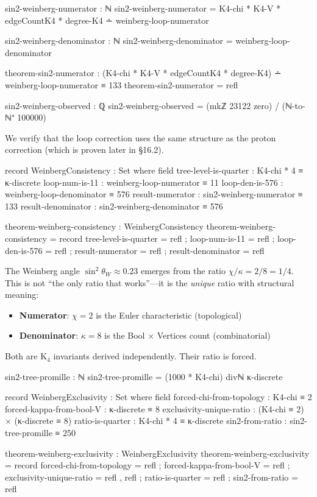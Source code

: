 \documentclass[11pt,a4paper]{book}
\begin{document}
\begin{code}
sin2-weinberg-numerator : ℕ
sin2-weinberg-numerator = K4-chi * K4-V * edgeCountK4 * degree-K4 ∸ weinberg-loop-numerator

sin2-weinberg-denominator : ℕ
sin2-weinberg-denominator = weinberg-loop-denominator

theorem-sin2-numerator : (K4-chi * K4-V * edgeCountK4 * degree-K4) ∸ weinberg-loop-numerator ≡ 133
theorem-sin2-numerator = refl

sin2-weinberg-observed : ℚ
sin2-weinberg-observed = (mkℤ 23122 zero) / (ℕ-to-ℕ⁺ 100000)
\end{code}

We verify that the loop correction uses the same structure as the proton correction (which is proven later in \S 16.2).

\begin{code}
record WeinbergConsistency : Set where
  field
    tree-level-is-quarter : K4-chi * 4 ≡ κ-discrete
    loop-num-is-11 : weinberg-loop-numerator ≡ 11
    loop-den-is-576 : weinberg-loop-denominator ≡ 576
    result-numerator : sin2-weinberg-numerator ≡ 133
    result-denominator : sin2-weinberg-denominator ≡ 576

theorem-weinberg-consistency : WeinbergConsistency
theorem-weinberg-consistency = record
  { tree-level-is-quarter = refl
  ; loop-num-is-11 = refl
  ; loop-den-is-576 = refl
  ; result-numerator = refl
  ; result-denominator = refl
  }
\end{code}

The Weinberg angle $\sin^2\theta_W \approx 0.23$ emerges from the ratio $\chi/\kappa = 2/8 = 1/4$. This is not ``the only ratio that works''---it is the \emph{unique} ratio with structural meaning:
\begin{itemize}
\item \textbf{Numerator}: $\chi = 2$ is the Euler characteristic (topological)
\item \textbf{Denominator}: $\kappa = 8$ is the Bool $\times$ Vertices count (combinatorial)
\end{itemize}
Both are K$_4$ invariants derived independently. Their ratio is forced.

\begin{code}
sin2-tree-promille : ℕ
sin2-tree-promille = (1000 * K4-chi) divℕ κ-discrete

record WeinbergExclusivity : Set where
  field
    forced-chi-from-topology   : K4-chi ≡ 2
    forced-kappa-from-bool-V   : κ-discrete ≡ 8
    exclusivity-unique-ratio   : (K4-chi ≡ 2) × (κ-discrete ≡ 8)
    ratio-is-quarter           : K4-chi * 4 ≡ κ-discrete
    sin2-from-ratio            : sin2-tree-promille ≡ 250

theorem-weinberg-exclusivity : WeinbergExclusivity
theorem-weinberg-exclusivity = record
  { forced-chi-from-topology = refl
  ; forced-kappa-from-bool-V = refl
  ; exclusivity-unique-ratio = refl , refl
  ; ratio-is-quarter = refl
  ; sin2-from-ratio = refl
  }
\end{code}
\end{document}
